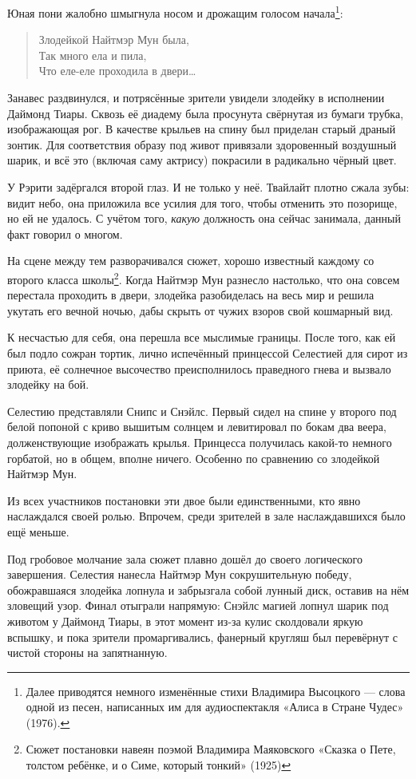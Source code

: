 \documentclass[twoside,a5paper,12pt]{extbook}
\begin{document}
Юная пони жалобно шмыгнула носом и дрожащим голосом начала\footnote{Далее приводятся немного изменённые стихи Владимира Высоцкого — слова одной из песен, написанных им для аудиоспектакля «Алиса в Стране Чудес» (1976).}:


\begin{quote}
Злодейкой Найтмэр Мун была,
\\
Так много ела и пила,
\\
Что еле-еле проходила в двери…
\end{quote}
    
Занавес раздвинулся, и потрясённые зрители увидели злодейку в исполнении Даймонд Тиары. Сквозь её диадему была просунута свёрнутая из бумаги трубка, изображающая рог. В качестве крыльев на спину был приделан старый драный зонтик. Для соответствия образу под живот привязали здоровенный воздушный шарик, и всё это (включая саму актрису) покрасили в радикально чёрный цвет.

У Рэрити задёргался второй глаз. И не только у неё. Твайлайт плотно сжала зубы: видит небо, она приложила все усилия для того, чтобы отменить это позорище, но ей не удалось. С учётом того, \textit{какую} должность она сейчас занимала, данный факт говорил о многом.

На сцене между тем разворачивался сюжет, хорошо известный каждому со второго класса школы\footnote{Сюжет постановки навеян поэмой Владимира Маяковского
«Сказка о Пете, толстом ребёнке, и о Симе, который
тонкий» (1925)}. Когда Найтмэр Мун разнесло настолько, что она совсем перестала проходить в двери, злодейка разобиделась на весь мир и решила укутать его вечной ночью, дабы скрыть от чужих взоров свой кошмарный вид.

К несчастью для себя, она перешла все мыслимые границы. После того, как ей был подло сожран тортик, лично испечённый принцессой Селестией для сирот из приюта, её солнечное высочество преисполнилось праведного гнева и вызвало злодейку на бой.

Селестию представляли Снипс и Снэйлс. Первый сидел на спине у второго под белой попоной с криво вышитым солнцем и левитировал по бокам два веера, долженствующие изображать крылья. Принцесса получилась какой-то немного горбатой, но в общем, вполне ничего. Особенно по сравнению со злодейкой Найтмэр Мун.

Из всех участников постановки эти двое были единственными, кто явно наслаждался своей ролью. Впрочем, среди зрителей в зале наслаждавшихся было ещё меньше.

Под гробовое молчание зала сюжет плавно дошёл до своего логического завершения. Селестия нанесла Найтмэр Мун сокрушительную победу, обожравшаяся злодейка лопнула и забрызгала собой лунный диск, оставив на нём зловещий узор. Финал отыграли напрямую: Снэйлс магией лопнул шарик под животом у Даймонд Тиары, в этот момент из-за кулис сколдовали яркую вспышку, и пока зрители промаргивались, фанерный кругляш был перевёрнут с чистой стороны на запятнанную.
\end{document}
